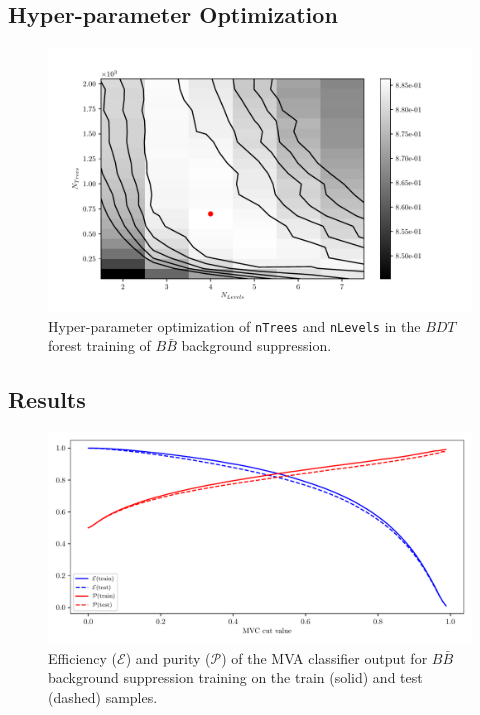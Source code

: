 \subsection{Hyper-parameter Optimization}

\begin{figure}[H]
\centering
\captionsetup{width=0.8\linewidth}
\includegraphics[width=\linewidth]{fig/addendums/BBcC_hpo}
\caption{Hyper-parameter optimization of \texttt{\footnotesize nTrees} and \texttt{\footnotesize nLevels} in the $BDT$ forest training of $B\bar B$ background suppression.}
\end{figure}

\subsection{Results}

\begin{figure}[H]
\centering
\captionsetup{width=0.8\linewidth}
\includegraphics[width=\linewidth]{fig/addendums/BBcC_effpur}
\caption{Efficiency ($\mathcal{E}$) and purity ($\mathcal{P}$) of the MVA classifier output for $B\bar B$ background suppression training on the train (solid) and test (dashed) samples.}
\end{figure}


